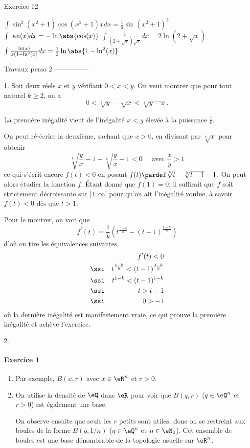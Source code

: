  Exercice 12
 \begin{enumerate}
   \exr $\int \sin^2(x^2+1) \cos(x^2+1) x d x = \frac16
   \sin(x^2+1)^3$%
   \exr $\int \tan(x) d x = -\ln\abs{\cos(x)}$%
   \exr $\int \frac{1}{(2+\sqrt{x})\sqrt x} d x= 2 \ln(2+\sqrt{x})$%
   \exr $\int \frac{\ln(x)}{x(1- \ln^2(x)} d x = \frac12
   \ln\abs{1-\ln^2(x)}$%
 \end{enumerate}



   Travaux perso 2 ---------------

   1. Soit deux réels $x$ et $y$ vérifiant $0 < x < y$. On veut montrer
   que pour tout naturel $k \geq 2$, on a
   \[0 < \sqrt[k]{y} - \sqrt[k]{x} < \sqrt[k]{y-x}.\]

   La première inégalité vient de l'inégalité $x < y$ élevée à la
   puissance $\frac1k$.

   On peut ré-écrire la deuxième, sachant que $x > 0$, en divisant par
   $\sqrt[k]{x}$ pour obtenir
   \begin{equation}
    \sqrt[k]{\frac yx} - 1 - \sqrt[k]{\frac yx-1} < 0 \quad \text{ avec }\frac xy > 1
   \end{equation}
     ce qui s'écrit encore $f(t) < 0$ en posant
   $f(t) \pardef \sqrt[k]t - \sqrt[k]{t-1} - 1$. On peut alors étudier
   la fonction $f$. Étant donné que $f(1) = 0$, il suffirait que $f$
   soit strictement décroissante sur $]1;\infty[$ pour qu'on ait
   l'inégalité voulue, à savoir $f(t) < 0$ dès que $t > 1$.

   Pour le montrer, on voit que
   \[f^\prime(t) = \frac 1k \left(t^{\frac{1-k}k} -
     ({t-1})^{\frac{1-k}k}\right)\] d'où on tire les équivalences
   suivantes
   \begin{align}
     & & f^\prime(t) < 0\\
     &\ssi& t^{\frac{1-k}k} < ({t-1})^{\frac{1-k}k}\\
     &\ssi& t^{1-k} < ({t-1})^{1-k}\\
     &\ssi& t > t-1\\
     &\ssi& 0 > -1
   \end{align}
   où la dernière inégalité est manifestement vraie, ce qui prouve la
   première inégalité et achève l'exercice.

   2.


 \paragraph{Exercice 1}
 \begin{enumerate}
 \item Par exemple, $B(x,r)$ avec $x \in \eR^n$ et $r > 0$.

 \item On utilise la densité de $\eQ$ dans $\eR$ pour voir que $B(q,r)$
   ($q \in \eQ^n$ et $r > 0$) est également une base.

   On observe ensuite que seuls les $r$ \og petits\fg{} sont utiles,
   donc on se restreint aux boules de la forme $B(q,1/n)$ ($q \in
   \eQ^n$ et $n \in \eN_0$). Cet ensemble de boules est une base
   dénombrable de la topologie usuelle sur
   $\eR^n$.
 \end{enumerate}

